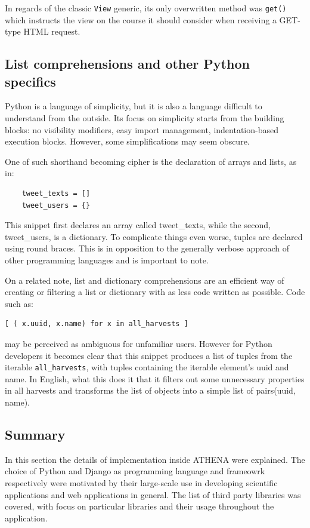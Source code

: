 In regards of the classic \texttt{View} generic, its only overwritten method was \texttt{get()} which instructs the view on the course it should consider when receiving a GET-type HTML request.

\subsection{List comprehensions and other Python specifics}
Python is a language of simplicity, but it is also a language difficult to understand from the outside. Its focus on simplicity starts from the building blocks: no visibility modifiers, easy import management, indentation-based execution blocks. However, some simplifications may seem obscure.

One of such shorthand becoming cipher is the declaration of arrays and lists, as in:
\begin{lstlisting}
    tweet_texts = []
    tweet_users = {}
\end{lstlisting}

This snippet first declares an array called tweet\_texts, while the second, tweet\_users, is a dictionary. To complicate things even worse, tuples are declared using round braces. This is in opposition to the generally verbose approach of other programming languages and is important to note.

On a related note, list and dictionary comprehensions are an efficient way of creating or filtering a list or dictionary with as less code written as possible. Code such as:

\begin{lstlisting}
[ ( x.uuid, x.name) for x in all_harvests ]
\end{lstlisting}

may be perceived as ambiguous for unfamiliar users. However for Python developers it becomes clear that this snippet produces a list of tuples from the iterable \texttt{all\_harvests}, with tuples containing the iterable element's uuid and name. In English, what this does it that it filters out some unnecessary properties in all harvests and transforms the list of objects into a simple list of pairs(uuid, name).

\subsection*{Summary}
In this section the details of implementation inside ATHENA were explained. The choice of Python and Django as programming language and frameowrk respectively were motivated by their large-scale use in developing scientific applications and web applications in general. The list of third party libraries was covered, with focus on particular libraries and their usage throughout the application.

